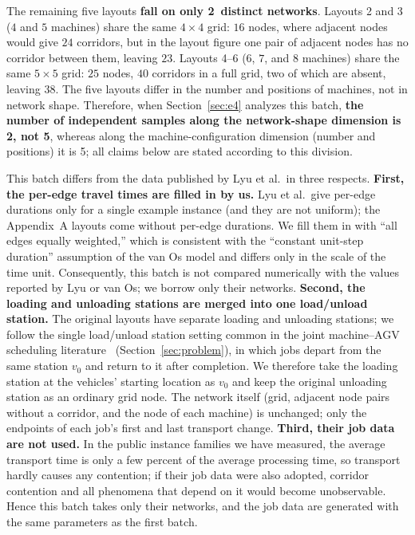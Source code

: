 \documentclass[manuscript,screen,review]{acmart}
\newcommand{\NPubInst}{5}
\newcommand{\NPubNets}{2}
\begin{document}
The remaining five layouts \textbf{fall on only \NPubNets\ distinct networks}. Layouts 2 and 3 (\(4\) and \(5\) machines) share the same \(4\times 4\) grid:
\(16\) nodes, where adjacent nodes would give \(24\) corridors, but in the layout figure one pair of adjacent nodes has no corridor between them, leaving \(23\).
Layouts 4--6 (\(6\), \(7\), and \(8\) machines) share the same \(5\times 5\) grid: \(25\) nodes, \(40\) corridors in a full grid,
two of which are absent, leaving \(38\). The five layouts differ in the number and positions of machines, not in network shape.
Therefore, when Section~\ref{sec:e4} analyzes this batch,
\textbf{the number of independent samples along the network-shape dimension is \NPubNets, not \NPubInst}, whereas along the machine-configuration dimension (number and positions)
it is \NPubInst; all claims below are stated according to this division.

This batch differs from the data published by Lyu et al.\ in three respects. \textbf{First, the per-edge travel times are filled in by us.}
Lyu et al.\ give per-edge durations only for a single example instance (and they are not uniform); the Appendix~A layouts come without per-edge durations.
We fill them in with ``all edges equally weighted,'' which is consistent with the ``constant unit-step duration'' assumption of the van Os model and differs only in the scale of the time unit.
Consequently, this batch is not compared numerically with the values reported by Lyu or van Os; we borrow only their networks.
\textbf{Second, the loading and unloading stations are merged into one load/unload station.} The original layouts have separate loading and unloading stations;
we follow the single load/unload station setting common in the joint machine--AGV scheduling literature~\cite{fontes2023hybrid} (Section~\ref{sec:problem}),
in which jobs depart from the same station \(v_0\) and return to it after completion. We therefore take the loading station at the vehicles' starting location as \(v_0\) and keep the original unloading station as an ordinary grid node.
The network itself (grid, adjacent node pairs without a corridor, and the node of each machine) is unchanged; only the endpoints of each job's first and last transport change.
\textbf{Third, their job data are not used.} In the public instance families we have measured, the average transport time is only a few percent of the average
processing time, so transport hardly causes any contention; if their job data were also adopted, corridor contention and all
phenomena that depend on it would become unobservable. Hence this batch takes only their networks, and the job data are generated with the same parameters as the first batch.
\end{document}
